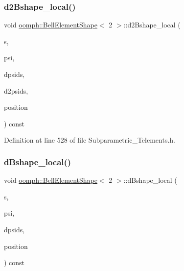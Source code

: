 \subsubsection{\texorpdfstring{d2\+Bshape\+\_\+local()}{d2Bshape\_local()}}
{\footnotesize\ttfamily void \hyperlink{classoomph_1_1BellElementShape}{oomph\+::\+Bell\+Element\+Shape}$<$ 2 $>$\+::d2\+Bshape\+\_\+local (\begin{DoxyParamCaption}\item[{const \hyperlink{classoomph_1_1Vector}{Vector}$<$ double $>$ \&}]{s,  }\item[{\hyperlink{classoomph_1_1Shape}{Shape} \&}]{psi,  }\item[{\hyperlink{classoomph_1_1DShape}{D\+Shape} \&}]{dpsids,  }\item[{\hyperlink{classoomph_1_1DShape}{D\+Shape} \&}]{d2psids,  }\item[{\hyperlink{classoomph_1_1DenseMatrix}{Dense\+Matrix}$<$ double $>$ \&}]{position }\end{DoxyParamCaption}) const\hspace{0.3cm}{\ttfamily [inline]}}



Definition at line 528 of file Subparametric\+\_\+\+Telements.\+h.

\mbox{\label{classoomph_1_1BellElementShape_3_012_01_4_abca489dcf440f32fc0b2c17577d65440}} 
\subsubsection{\texorpdfstring{d\+Bshape\+\_\+local()}{dBshape\_local()}}
{\footnotesize\ttfamily void \hyperlink{classoomph_1_1BellElementShape}{oomph\+::\+Bell\+Element\+Shape}$<$ 2 $>$\+::d\+Bshape\+\_\+local (\begin{DoxyParamCaption}\item[{const \hyperlink{classoomph_1_1Vector}{Vector}$<$ double $>$ \&}]{s,  }\item[{\hyperlink{classoomph_1_1Shape}{Shape} \&}]{psi,  }\item[{\hyperlink{classoomph_1_1DShape}{D\+Shape} \&}]{dpsids,  }\item[{\hyperlink{classoomph_1_1DenseMatrix}{Dense\+Matrix}$<$ double $>$ \&}]{position }\end{DoxyParamCaption}) const\hspace{0.3cm}{\ttfamily [inline]}}



